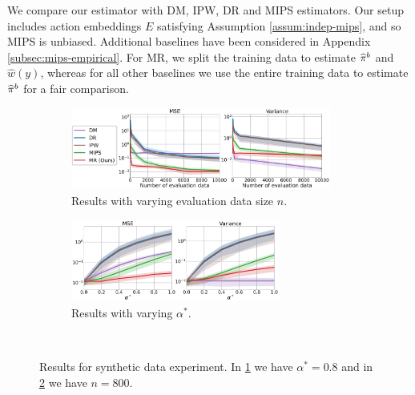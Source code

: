 We compare our estimator with DM, IPW, DR and MIPS estimators. Our setup includes action embeddings $E$ satisfying Assumption \ref{assum:indep-mips}, and so MIPS is unbiased.
Additional baselines have been considered in Appendix \ref{subsec:mips-empirical}.
For MR, we split the training data to estimate $\widehat{\pi}^b$ and $\hat{w}(y)$, whereas for all other baselines we use the entire training data to estimate $\widehat{\pi}^b$ for a fair comparison.
\begin{figure}[t]
     \centering
     \begin{subfigure}[b]{0.5\textwidth}
         \centering
         \includegraphics[height=1.06in]{figures/mr/ope_vs_neval_nac_100_alphatar_0_8_dimc_1000_untrunc.png}
         \caption{Results with varying evaluation data size $n$.}
         \label{fig:mse-vs-neval}
     \end{subfigure}%
     \begin{subfigure}[b]{0.5\textwidth}
         \centering
         \includegraphics[height=1.06in]{figures/mr/ope_vs_alphatar_nac_100_neval_800_dimc_1000.png}
         \caption{Results with varying $\alpha^\ast$.}
         \label{fig:mse-vs-betatar}
     \end{subfigure}\\
    \caption{Results for synthetic data experiment. In \ref{fig:mse-vs-neval} we have $\alpha^\ast=0.8$ and in \ref{fig:mse-vs-betatar} we have $n = 800$.}
    \label{fig:syn_results1}
\end{figure}

